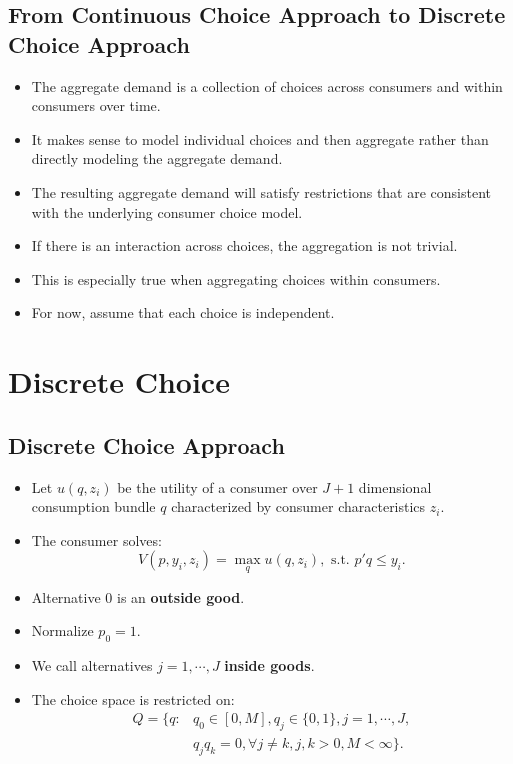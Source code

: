 \documentclass[
]{book}
\providecommand{\tightlist}{%
  \setlength{\itemsep}{0pt}\setlength{\parskip}{0pt}}
\begin{document}
\hypertarget{from-continuous-choice-approach-to-discrete-choice-approach}{%
\subsection{From Continuous Choice Approach to Discrete Choice Approach}\label{from-continuous-choice-approach-to-discrete-choice-approach}}

\begin{itemize}
\tightlist
\item
  The aggregate demand is a collection of choices across consumers and within consumers over time.
\item
  It makes sense to model individual choices and then aggregate rather than directly modeling the aggregate demand.
\item
  The resulting aggregate demand will satisfy restrictions that are consistent with the underlying consumer choice model.
\item
  If there is an interaction across choices, the aggregation is not trivial.
\item
  This is especially true when aggregating choices within consumers.
\item
  For now, assume that each choice is independent.
\end{itemize}

\hypertarget{discrete-choice}{%
\section{Discrete Choice}\label{discrete-choice}}

\hypertarget{discrete-choice-approach}{%
\subsection{Discrete Choice Approach}\label{discrete-choice-approach}}

\begin{itemize}
\tightlist
\item
  Let \(u(q, z_i)\) be the utility of a consumer over \(J + 1\) dimensional consumption bundle \(q\) characterized by consumer characteristics \(z_i\).
\item
  The consumer solves:
  \begin{equation}
  V(p, y_i, z_i) = \max_{q}u(q, z_i), \text{   s.t.   } p'q \le y_i.
  \end{equation}
\item
  Alternative \(0\) is an \textbf{outside good}.
\item
  Normalize \(p_0 = 1\).
\item
  We call alternatives \(j = 1, \cdots, J\) \textbf{inside goods}.
\item
  The choice space is restricted on:
  \begin{equation}
  \begin{split}
  Q = \{q:& q_0 \in [0, M], q_j \in \{0, 1\}, j = 1, \cdots, J,\\
  & q_j q_k = 0, \forall j \neq k, j, k > 0, M < \infty\}.
  \end{split}
  \end{equation}
\end{itemize}
\end{document}

